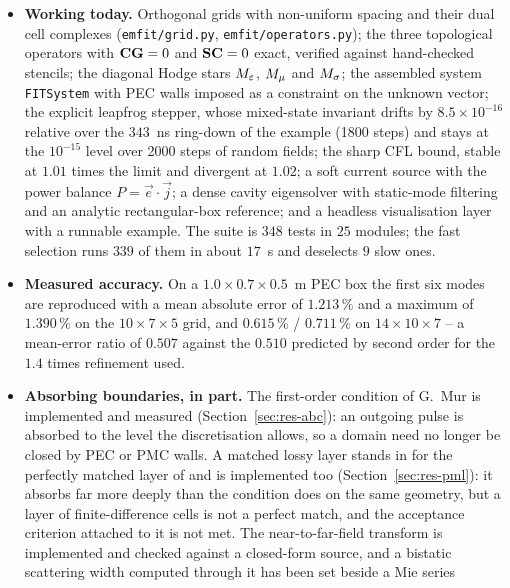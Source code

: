 \begin{itemize}[leftmargin=1.4em,itemsep=2pt]
  \item[] \textbf{Working today.}
        Orthogonal grids with non-uniform spacing and their dual cell complexes (\texttt{emfit/grid.py},
        \texttt{emfit/operators.py}); the three topological operators with $\mathbf{C}\mathbf{G} = 0$ and $\mathbf{S}\mathbf{C} = 0$
        exact, verified against hand-checked stencils; the diagonal Hodge stars ${M_{\varepsilon}}$, ${M_{\mu}}$ and ${M_{\sigma}}$; the
        assembled system \texttt{FITSystem} with PEC walls imposed as a constraint on the unknown vector; the
        explicit leapfrog stepper, whose mixed-state invariant drifts by $8.5\times10^{-16}$ relative over the
        $343$~ns ring-down of the example (1800 steps) and stays at the $10^{-15}$ level over 2000 steps of random
        fields; the sharp CFL bound, stable at $1.01$ times the limit and divergent at $1.02$; a soft current
        source with the power balance $P = \vec e\cdot\vec j$; a dense cavity eigensolver with static-mode
        filtering and an analytic rectangular-box reference; and a headless visualisation layer with a runnable
        example. The suite is $348$ tests in $25$ modules; the fast selection runs $339$ of them in about
        $17$~s and deselects $9$ slow ones.
  \item[] \textbf{Measured accuracy.} On a $1.0\times0.7\times0.5$~m PEC box the first six modes are reproduced
        with a mean absolute error of $1.213\,\%$ and a maximum of $1.390\,\%$ on the $10\times7\times5$ grid, and
        $0.615\,\%$ / $0.711\,\%$ on $14\times10\times7$ -- a mean-error ratio of $0.507$ against the $0.510$
        predicted by second order for the $1.4$ times refinement used.
  \item[] \textbf{Absorbing boundaries, in part.} The first-order condition of G.~Mur \cite{mur1981} is
        implemented and measured (Section~\ref{sec:res-abc}): an outgoing pulse is absorbed to the level the
        discretisation allows, so a domain need no longer be closed by PEC or PMC walls. A matched lossy layer
        stands in for the perfectly matched layer of \cite{berenger1994} and is implemented too
        (Section~\ref{sec:res-pml}): it absorbs far more deeply than the condition does on the same geometry,
        but a layer of finite-difference cells is not a perfect match, and the acceptance criterion attached to
        it is not met. The near-to-far-field transform is implemented and checked against a closed-form source,
        and a bistatic scattering width computed through it has been set beside a Mie series

\end{itemize}
